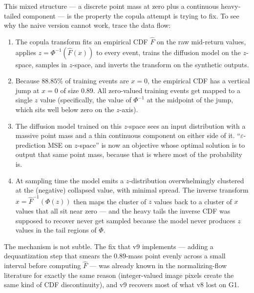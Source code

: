 \documentclass[journal]{IEEEtran}
\newcommand{\eps}{\varepsilon}
\theoremstyle{definition}   %
\begin{document}
This mixed structure --- a discrete point mass at zero plus a
continuous heavy-tailed component --- is the property the copula
attempt is trying to fix. To see why the naive version cannot
work, trace the data flow:
\begin{enumerate}
    \item The copula transform fits an empirical CDF $\hat{F}$ on
    the raw mid-return values, applies $z = \Phi^{-1}(\hat{F}(x))$
    to every event, trains the diffusion model on the $z$-space,
    samples in $z$-space, and inverts the transform on the
    synthetic outputs.
    \item Because $88.85\%$ of training events are $x = 0$, the
    empirical CDF has a vertical jump at $x=0$ of size $0.89$. All
    zero-valued training events get mapped to a single $z$ value
    (specifically, the value of $\Phi^{-1}$ at the midpoint of
    the jump, which sits well below zero on the $z$-axis).
    \item The diffusion model trained on this $z$-space sees an
    input distribution with a massive point mass and a thin
    continuous component on either side of it.
    ``$\eps$-prediction MSE on $z$-space'' is now an objective
    whose optimal solution is to output that same point mass,
    because that is where most of the probability is.
    \item At sampling time the model emits a $z$-distribution
    overwhelmingly clustered at the (negative) collapsed value,
    with minimal spread. The inverse transform $x =
    \hat{F}^{-1}(\Phi(z))$ then maps the cluster of $z$ values
    back to a cluster of $x$ values that all sit near zero ---
    and the heavy tails the inverse CDF was supposed to recover
    never get sampled because the model never produces $z$ values
    in the tail regions of $\Phi$.
\end{enumerate}

The mechanism is not subtle. The fix that v9 implements ---
adding a dequantization step that smears the $0.89$-mass point
evenly across a small interval before computing $\hat{F}$ ---
was already known in the normalizing-flow literature for exactly
the same reason (integer-valued image pixels create the same kind
of CDF discontinuity), and v9 recovers most of what v8 lost on
G1.
\end{document}
